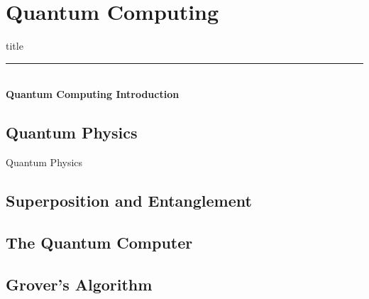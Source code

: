 \section{Quantum Computing}

	\begin{frame}[plain]
		\vfill
		\centering
		\begin{beamercolorbox}[sep=8pt,center,shadow=true,rounded=true]{title}
			\textbf{\insertsectionhead}\par%
			\color{polimiblue}\noindent\rule{10cm}{1pt} \\
			\textbf{Quantum Computing Introduction}
		\end{beamercolorbox}
		\vfill
	\end{frame}

	\subsection{Quantum Physics}
		\begin{frame}{Quantum Physics}
			
		\end{frame}

	\subsection{Superposition and Entanglement}
			
		
			
	
	\subsection{The Quantum Computer}
			
	
	\subsection{Grover's Algorithm}
			
	